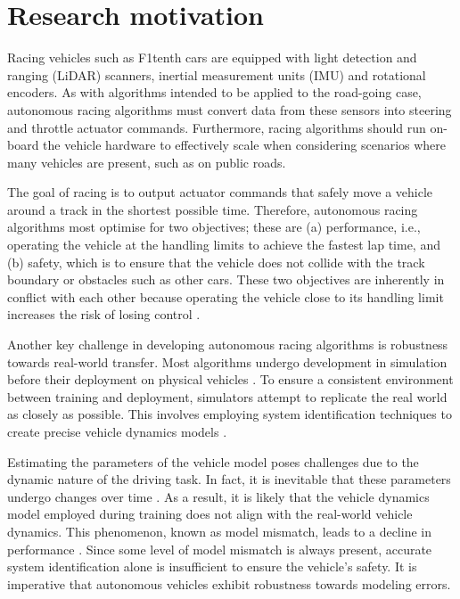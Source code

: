 \section{Research motivation}

Racing vehicles such as F1tenth cars are equipped with light detection and ranging (LiDAR) scanners, inertial measurement units (IMU) and rotational encoders.
As with algorithms intended to be applied to the road-going case, autonomous racing algorithms must convert data from these sensors into steering and throttle actuator commands.
Furthermore, racing algorithms should run on-board the vehicle hardware \cite{Babu2020, f1tenth} to effectively scale when considering scenarios where many vehicles are present, such as on public roads.

The goal of racing is to output actuator commands that safely move a vehicle around a track in the shortest possible time.
Therefore, autonomous racing algorithms most optimise for two objectives;
these are (a) performance, i.e., operating the vehicle at the handling limits to achieve the fastest lap time, and (b) safety, which is to ensure that the vehicle does not collide with the track boundary or obstacles such as other cars.
These two objectives are inherently in conflict with each other because operating the vehicle close to its handling limit increases the risk of losing control \cite{Betz2021}.


Another key challenge in developing autonomous racing algorithms is robustness towards real-world transfer.
Most algorithms undergo development in simulation before their deployment on physical vehicles \cite{Babu2020, Zhou2020}.
To ensure a consistent environment between training and deployment, simulators attempt to replicate the real world as closely as possible.
This involves employing system identification techniques to create precise vehicle dynamics models \cite{Zhou2020}.

Estimating the parameters of the vehicle model poses challenges due to the dynamic nature of the driving task. 
In fact, it is inevitable that these parameters undergo changes over time \cite{Zhao2017}.
As a result, it is likely that the vehicle dynamics model employed during training does not align with the real-world vehicle dynamics. 
This phenomenon, known as model mismatch, leads to a decline in performance \cite{Ghignone2022}. 
Since some level of model mismatch is always present, accurate system identification alone is insufficient to ensure the vehicle's safety. 
It is imperative that autonomous vehicles exhibit robustness towards modeling errors.

